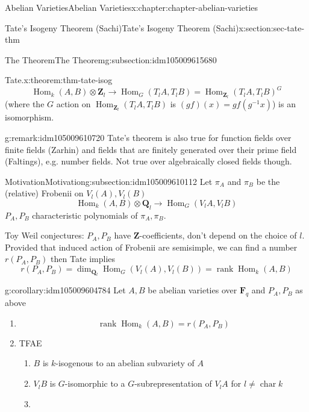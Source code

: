 \documentclass[oneside,10pt,]{book}
\numberwithin{equation}{section}
\newcommand{\ZZ}{\mathbf{Z}}
\newcommand{\QQ}{\mathbf{Q}}
\newcommand{\FF}{\mathbf{F}}
\DeclareMathOperator{\Hom}{Hom}
\DeclareMathOperator{\rank}{rank}
\DeclareMathOperator{\characteristic}{char}
\begin{document}
\begin{chapterptx}{Abelian Varieties}{}{Abelian Varieties}{}{}{x:chapter:chapter-abelian-varieties}
\begin{sectionptx}{Tate's Isogeny Theorem (Sachi)}{}{Tate's Isogeny Theorem (Sachi)}{}{}{x:section:sec-tate-thm}
\begin{subsectionptx}{The Theorem}{}{The Theorem}{}{}{g:subsection:idm105009615680}
\begin{theorem}{Tate.}{}{x:theorem:thm-tate-isog}
\begin{equation*}
\Hom_{k}(A,B)\otimes \ZZ_l \to \Hom_G(T_l A, T_lB) = \Hom_{\ZZ_l}(T_lA,T_lB)^G
\end{equation*}
(where the \(G\) action on \(\Hom_{\ZZ_l}(T_l A, T_lB)\) is \((gf)(x) = gf(g^{-1}x)\)) is an isomorphism.%
\end{theorem}
\begin{remark}{}{g:remark:idm105009610720}%
Tate's theorem is also true for function fields over finite fields (Zarhin) and fields that are finitely generated over their prime field (Faltings), e.g. number fields. Not true over algebraically closed fields though.%
\end{remark}
\end{subsectionptx}
%
%
\typeout{************************************************}
\typeout{************************************************}
%
\begin{subsectionptx}{Motivation}{}{Motivation}{}{}{g:subsection:idm105009610112}
Let \(\pi_A\) and \(\pi_B\) be the (relative) Frobenii on \(V_l(A), V_l(B)\)%
\begin{equation*}
\Hom_{k}(A,B)\otimes \QQ_l \to \Hom_G(V_l A, V_lB)
\end{equation*}
\(P_A,P_B\) characteristic polynomials of \(\pi_A,\pi_B\).%
\par
Toy Weil conjectures: \(P_A, P_B\) have \(\ZZ\)-coefficients, don't depend on the choice of \(l\). Provided that induced action of Frobenii are semisimple, we can find a number \(r(P_A,P_B)\) then Tate implies%
\begin{equation*}
r(P_A,P_B) = \dim_{\QQ_l} \Hom_G (V_l(A), V_l(B)) = \rank \Hom_k(A,B)
\end{equation*}
%
\begin{corollary}{}{}{g:corollary:idm105009604784}%
Let \(A, B\) be abelian varieties over \(\FF_q\) and \(P_A, P_B\) as above%
\begin{enumerate}
\item{}%
\begin{equation*}
\rank \Hom_k(A,B) = r(P_A,P_B)
\end{equation*}
%
\item{}TFAE%
\begin{enumerate}
\item{}\(B\) is \(k\)-isogenous to an abelian subvariety of \(A\)%
\item{}\(V_lB\) is \(G\)-isomorphic to a \(G\)-subrepresentation of \(V_lA\) for \(l \ne \characteristic k\)%
\item{}%

\end{enumerate}
\end{enumerate}
\end{corollary}
\end{subsectionptx}
\end{sectionptx}
\end{chapterptx}
\end{document}
